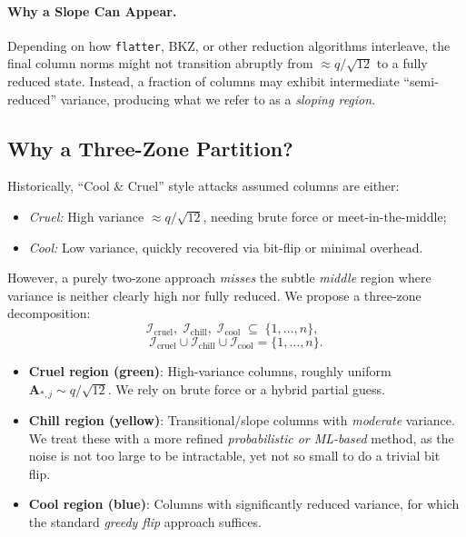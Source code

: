 \documentclass[conference]{IEEEtran}
\begin{document}

\paragraph{Why a Slope Can Appear.}
Depending on how \texttt{flatter}, BKZ, or other reduction algorithms interleave, the final column norms might not transition abruptly from $\approx q/\sqrt{12}$ to a fully reduced state. Instead, a fraction of columns may exhibit intermediate ``semi-reduced'' variance, producing what we refer to as a \emph{sloping region}.


\subsection{Why a Three-Zone Partition?}
\label{subsec:3zone}

Historically, ``Cool \& Cruel'' style attacks assumed columns are either:
\begin{itemize}
    \item \emph{Cruel:} High variance $\approx q/\sqrt{12}$, needing brute force or meet-in-the-middle;
    \item \emph{Cool:} Low variance, quickly recovered via bit-flip or minimal overhead.
\end{itemize}
However, a purely two-zone approach \emph{misses} the subtle \emph{middle} region where variance is neither clearly high nor fully reduced. We propose a three-zone decomposition:
\[
  \mathcal{I}_{\mathrm{cruel}},\;
  \mathcal{I}_{\mathrm{chill}},\;
  \mathcal{I}_{\mathrm{cool}}
  \;\subseteq\;\{1,\ldots,n\}, 
  \;\;
\]
\[
  \mathcal{I}_{\mathrm{cruel}}\cup\mathcal{I}_{\mathrm{chill}}\cup\mathcal{I}_{\mathrm{cool}}=\{1,\ldots,n\}.
\]

\begin{itemize}
  \item \textbf{Cruel region (green)}: 
  High-variance columns, roughly uniform $\mathbf{A}_{*,j} \sim q/\sqrt{12}$. 
  We rely on brute force or a hybrid partial guess.
  \item \textbf{Chill region (yellow)}: 
  Transitional/slope columns with \emph{moderate} variance. 
  We treat these with a more refined \emph{probabilistic or ML-based} method, as the noise is not too large to be intractable, yet not so small to do a trivial bit flip.
  \item \textbf{Cool region (blue)}: 
  Columns with significantly reduced variance, for which the standard \emph{greedy flip} approach suffices.
\end{itemize}
\end{document}
